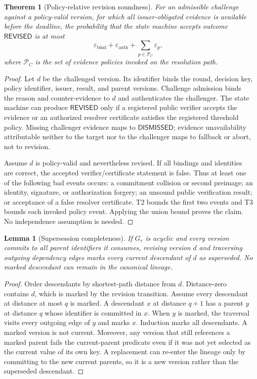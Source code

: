 \documentclass[10pt]{article}
\newtheorem{theorem}{Theorem}
\newtheorem{lemma}{Lemma}
\newcommand{\REVISED}{\mathsf{REVISED}}
\newcommand{\DISMISSED}{\mathsf{DISMISSED}}
\begin{document}
\begin{theorem}[Policy-relative revision soundness]
For an admissible challenge against a policy-valid version, for which all
issuer-obligated evidence is available before the deadline, the probability
that the state machine accepts outcome $\REVISED$ is at most
\[
  \varepsilon_{\mathrm{bind}}+\varepsilon_{\mathrm{auth}}
  +\sum_{p\in\mathcal P_C}\varepsilon_p,
\]
where $\mathcal P_C$ is the set of evidence policies invoked on the resolution
path.
\end{theorem}
\begin{proof}
Let $d$ be the challenged version.  Its identifier binds the round, decision
key, policy identifier, issuer, result, and parent versions.  Challenge
admission binds the reason and counter-evidence to $d$ and authenticates the
challenger.  The state machine can produce $\REVISED$ only if a registered
public verifier accepts the evidence or an authorized resolver certificate
satisfies the registered threshold policy.  Missing challenger evidence maps
to $\DISMISSED$; evidence unavailability attributable neither to the target nor
to the challenger maps to fallback or abort, not to revision.

Assume $d$ is policy-valid and nevertheless revised.  If all bindings and
identities are correct, the accepted verifier/certificate statement is false.
Thus at least one of the following bad events occurs: a commitment collision or
second preimage; an identity, signature, or authorization forgery; an unsound
public verification result; or acceptance of a false resolver certificate.
T2 bounds the first two events and T3 bounds each invoked policy event.  Applying
the union bound proves the claim.  No independence assumption is needed.
\end{proof}

\begin{lemma}[Supersession completeness]
If $G_r$ is acyclic and every version commits to all parent identifiers it
consumes, revising version $d$ and traversing outgoing dependency edges marks
every current descendant of $d$ as superseded.  No marked descendant can remain
in the canonical lineage.
\end{lemma}
\begin{proof}
Order descendants by shortest-path distance from $d$.  Distance-zero contains
$d$, which is marked by the revision transition.  Assume every descendant at
distance at most $q$ is marked.  A descendant $x$ at distance $q+1$ has a parent
$y$ at distance $q$ whose identifier is committed in $x$.  When $y$ is marked,
the traversal visits every outgoing edge of $y$ and marks $x$.  Induction marks
all descendants.  A marked version is not current.  Moreover, any version that
still references a marked parent fails the current-parent predicate even if it
was not yet selected as the current value of its own key.  A replacement can
re-enter the lineage only by committing to the new current parents, so it is a
new version rather than the superseded descendant.
\end{proof}
\end{document}
